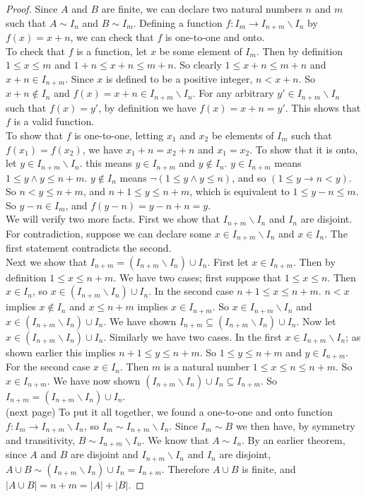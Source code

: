 \documentclass{report}
\theoremstyle{definition}
\begin{document}
\begin{proof}
Since $A$ and $B$ are finite, we can declare two natural numbers $n$ and $m$ such that $A\sim I_n$ and $B\sim I_m$. Defining a function $f:I_m\to I_{n+m}\backslash I_n$ by $f(x)=x+n$, we
can check that $f$ is one-to-one and onto.\\
\indent To check that $f$ is a function, let $x$ be some element of $I_m$. Then by definition
$1\leq x\leq m$ and $1+n\leq x+n\leq m+n$. So clearly $1\leq x+n\leq m+n$ and $x+n\in I_{n+m}$. Since $x$ is defined to be a positive integer, $n<x+n$. So $x+n\notin I_n$ and 
$f(x)=x+n\in I_{n+m}\backslash I_n$.
For any arbitrary $y'\in I_{n+m}\backslash I_n$ such that $f(x)=y'$, by definition we have $f(x)=x+n=y'$. This shows that $f$ is a valid function.\\
\indent To show that $f$ is one-to-one, letting $x_1$ and $x_2$ be elements of $I_m$ such that $f(x_1)=f(x_2)$, we have $x_1+n=x_2+n$ and $x_1=x_2$. To show that it is onto, let 
$y\in I_{n+m}\backslash I_n$. this means $y\in I_{n+m}$ and $y\notin I_n$. $y\in I_{n+m}$ means $1\leq y\land y\leq n+m$. $y\notin I_n$ means $\neg(1\leq y\land y\leq n)$, and so $(1\leq y\to n<y)$.
So $n<y\leq n+m$, and $n+1\leq y\leq n+m$, which is equivalent to $1\leq y-n\leq m$. So $y-n\in I_m$, and $f(y-n)=y-n+n=y$.\\
\indent We will verify two more facts. First we show that $I_{n+m}\backslash I_n$ and $I_n$ are disjoint. For contradiction, suppose we can declare some $x\in I_{n+m}\backslash I_n$ and $x\in I_n$.
The first statement contradicts the second.\\
\indent Next we show that 
$I_{n+m}=(I_{n+m}\backslash I_n)\cup I_n$. First let $x\in I_{n+m}$. Then by definition $1\leq x\leq n+m$. We have two cases; first suppose that $1\leq x\leq n$. Then $x\in I_n$, so 
$x\in(I_{n+m}\backslash I_n)\cup I_n$. 
In the second case $n+1\leq x\leq n+m$. $n<x$ implies $x\notin I_n$ and $x\leq n+m$ implies $x\in I_{n+m}$. So $x\in I_{n+m}\backslash I_n$ and $x\in(I_{n+m}\backslash I_n)\cup I_n$. We have shown 
$I_{n+m}\subseteq(I_{n+m}\backslash I_n)\cup I_n$. Now let $x\in(I_{n+m}\backslash I_n)\cup I_n$.
Similarly we have two cases. In the first $x\in I_{n+m}\backslash I_n$; as shown earlier this implies $n+1\leq y\leq n+m$. So $1\leq y\leq n+m$ and $y\in I_{n+m}$. For the second case
$x\in I_n$. Then $m$ is a natural number $1\leq x\leq n\leq n+m$. So $x\in I_{n+m}$. We have now shown $(I_{n+m}\backslash I_n)\cup I_n\subseteq I_{n+m}$. So
$I_{n+m}=(I_{n+m}\backslash I_n)\cup I_n$.\\
(next page)\newpage
\indent To put it all together, we found a one-to-one and onto function $f:I_m\to I_{n+m}\backslash I_n$, so $I_m\sim I_{n+m}\backslash I_n$. Since $I_m\sim B$ we then have, by symmetry and 
transitivity, $B\sim I_{n+m}\backslash I_n$. We know that $A\sim I_n$. By an earlier theorem, since
$A$ and $B$ are disjoint and $I_{n+m}\backslash I_n$ and $I_n$ are disjoint,
$A\cup B\sim(I_{n+m}\backslash I_n)\cup I_n=I_{n+m}$.
Therefore $A\cup B$ is finite, and $|A\cup B|=n+m=|A|+|B|$. 
\end{proof}
\end{document}
